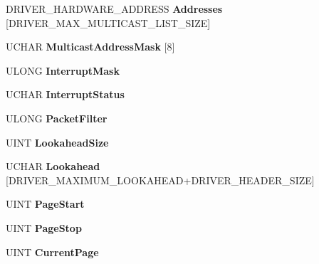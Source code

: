 \begin{DoxyCompactItemize}
D\+R\+I\+V\+E\+R\+\_\+\+H\+A\+R\+D\+W\+A\+R\+E\+\_\+\+A\+D\+D\+R\+E\+SS {\bfseries Addresses} \mbox{[}D\+R\+I\+V\+E\+R\+\_\+\+M\+A\+X\+\_\+\+M\+U\+L\+T\+I\+C\+A\+S\+T\+\_\+\+L\+I\+S\+T\+\_\+\+S\+I\+ZE\mbox{]}
\item 
\mbox{\label{struct___n_i_c___a_d_a_p_t_e_r_a53f729fcbb69705e570d5f6571679320}} 
U\+C\+H\+AR {\bfseries Multicast\+Address\+Mask} \mbox{[}8\mbox{]}
\item 
\mbox{\label{struct___n_i_c___a_d_a_p_t_e_r_a2b31a7edb678967f357aa1f9c70aeac9}} 
U\+L\+O\+NG {\bfseries Interrupt\+Mask}
\item 
\mbox{\label{struct___n_i_c___a_d_a_p_t_e_r_a605baf887b5a9572a6402734b4ae8dae}} 
U\+C\+H\+AR {\bfseries Interrupt\+Status}
\item 
\mbox{\label{struct___n_i_c___a_d_a_p_t_e_r_a09bdc60894259ab8c3a3a370d7b7c02f}} 
U\+L\+O\+NG {\bfseries Packet\+Filter}
\item 
\mbox{\label{struct___n_i_c___a_d_a_p_t_e_r_ad8bc2a8da0d0abbd0427115e6e1b4110}} 
U\+I\+NT {\bfseries Lookahead\+Size}
\item 
\mbox{\label{struct___n_i_c___a_d_a_p_t_e_r_a885902136783ca21ee8df0b1a6a5f7dd}} 
U\+C\+H\+AR {\bfseries Lookahead} \mbox{[}D\+R\+I\+V\+E\+R\+\_\+\+M\+A\+X\+I\+M\+U\+M\+\_\+\+L\+O\+O\+K\+A\+H\+E\+AD+D\+R\+I\+V\+E\+R\+\_\+\+H\+E\+A\+D\+E\+R\+\_\+\+S\+I\+ZE\mbox{]}
\item 
\mbox{\label{struct___n_i_c___a_d_a_p_t_e_r_a38e4a8d260c5e82149e9f551eabe8552}} 
U\+I\+NT {\bfseries Page\+Start}
\item 
\mbox{\label{struct___n_i_c___a_d_a_p_t_e_r_a436d570a42d91a87e2bb862a90cf32dc}} 
U\+I\+NT {\bfseries Page\+Stop}
\item 
\mbox{\label{struct___n_i_c___a_d_a_p_t_e_r_a2037aac667b8d7eaafdd5db8b1d4b654}} 
U\+I\+NT {\bfseries Current\+Page}
\item 

\end{DoxyCompactItemize}
